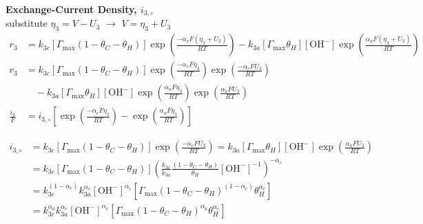 \documentclass[12pt]{article}
\begin{document}
  \textbf{Exchange-Current Density, $i_{3,\circ}$} \\
  substitute $ \eta_3 = V - U_3$ $\rightarrow$ $ V = \eta_3 + U_3$
  \begin{equation*}
  \begin{split}
    r_3 &= k_{3c} \left[\Gamma_{\max} (1 - \theta_C - \theta_H) \right] \exp{ \left( \frac{-\alpha_c F (\eta_3 + U_3)}{RT} \right)}
    - k_{3a} \left[ \Gamma_{\max} \theta_H \right] \left[\text{OH}^- \right]
    \exp{\left( \frac{\alpha_a F (\eta_3 + U_3)}{RT} \right)}
    \\
    r_3 &= k_{3c} \left[\Gamma_{\max} (1 - \theta_C - \theta_H) \right] \exp{ \left( \frac{-\alpha_c F \eta_3}{RT} \right)} \exp{ \left( \frac{-\alpha_c F U_3}{RT} \right)} \\
    & \quad - k_{3a} \left[ \Gamma_{\max} \theta_H \right] \left[\text{OH}^- \right]
    \exp{\left( \frac{\alpha_a F \eta_3}{RT} \right)} \exp{\left( \frac{\alpha_a F U_3}{RT} \right)}
    \\
    \frac{i_3}{F} &= i_{3, \circ} \left[ \exp{\left( \frac{-\alpha_c F \eta_3}{RT} \right)} -\exp{\left( \frac{\alpha_a F \eta_3}{RT} \right)}  \right]
  \end{split}
  \end{equation*}

  \begin{equation*}
  \begin{split}
    i_{3, \circ} &= k_{3c} \left[\Gamma_{\max} (1 - \theta_C - \theta_H) \right] \exp{ \left( \frac{-\alpha_c F U_3}{RT} \right)}
    = k_{3a} \left[ \Gamma_{\max} \theta_H \right] \left[\text{OH}^- \right] \exp{\left( \frac{\alpha_a F U_3}{RT} \right)}
    \\
    & = k_{3c} \left[\Gamma_{\max} (1 - \theta_C - \theta_H) \right]
    \left( \frac{k_{3c}}{k_{3a}} \frac{(1 - \theta_C - \theta_H)}{\theta_H} \left[\text{OH}^- \right]^{-1} \right)^{-\alpha_c}
    \\
    & = k_{3c}^{(1-\alpha_c)} k_{3a}^{\alpha_c} \left[\text{OH}^- \right]^{\alpha_c} \left[\Gamma_{\max} (1 - \theta_C - \theta_H)^{(1-\alpha_c)} \theta_H^{\alpha_c} \right]
    \\
    & = k_{3c}^{\alpha_a} k_{3a}^{\alpha_c} \left[\text{OH}^- \right]^{\alpha_c} \left[\Gamma_{\max} (1 - \theta_C - \theta_H)^{\alpha_a} \theta_H^{\alpha_c} \right]
    \end{split}
  \end{equation*}
\end{document}
